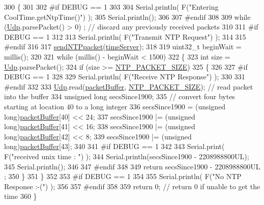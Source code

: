 \begin{DoxyCode}
300 \{
301 
302 \textcolor{preprocessor}{#if DEBUG == 1 }
303 
304     Serial.println( F(\textcolor{stringliteral}{"Entering CoolTime.getNtpTime()"}) );
305     Serial.println();
306 
307 \textcolor{preprocessor}{#endif }
308 
309     \textcolor{keywordflow}{while} (\hyperlink{classCoolTime_a4e23216a8121ca79d0fb019f30884b92}{Udp}.parsePacket() > 0) ; \textcolor{comment}{// discard any previously received packets}
310 
311 \textcolor{preprocessor}{#if DEBUG == 1 }
312     
313     Serial.println( F(\textcolor{stringliteral}{"Transmit NTP Request"}) );
314 
315 \textcolor{preprocessor}{#endif }
316 
317     \hyperlink{classCoolTime_a236a38d120dc53bc67456d763838c5a1}{sendNTPpacket}(\hyperlink{classCoolTime_ad2b9858f399108cb440dd1e908916f04}{timeServer});
318 
319     uint32\_t beginWait = millis();
320 
321     \textcolor{keywordflow}{while} (millis() - beginWait < 1500) 
322     \{
323         \textcolor{keywordtype}{int} size = \hyperlink{classCoolTime_a4e23216a8121ca79d0fb019f30884b92}{Udp}.parsePacket();
324         \textcolor{keywordflow}{if} (size >= \hyperlink{CoolTime_8h_a56a6ea64006651b4f42adf713e244f06}{NTP\_PACKET\_SIZE}) 
325         \{
326         
327 \textcolor{preprocessor}{        #if DEBUG == 1}
328 
329             Serial.println( F(\textcolor{stringliteral}{"Receive NTP Response"}) );
330         
331 \textcolor{preprocessor}{        #endif}
332 
333             \hyperlink{classCoolTime_a4e23216a8121ca79d0fb019f30884b92}{Udp}.read(\hyperlink{classCoolTime_a27e6abc82a5c2f72161956967005bec7}{packetBuffer}, \hyperlink{CoolTime_8h_a56a6ea64006651b4f42adf713e244f06}{NTP\_PACKET\_SIZE});  \textcolor{comment}{// read packet into the
       buffer}
334             \textcolor{keywordtype}{unsigned} \textcolor{keywordtype}{long} secsSince1900;
335             \textcolor{comment}{// convert four bytes starting at location 40 to a long integer}
336             secsSince1900 =  (\textcolor{keywordtype}{unsigned} long)\hyperlink{classCoolTime_a27e6abc82a5c2f72161956967005bec7}{packetBuffer}[40] << 24;
337             secsSince1900 |= (\textcolor{keywordtype}{unsigned} long)\hyperlink{classCoolTime_a27e6abc82a5c2f72161956967005bec7}{packetBuffer}[41] << 16;
338             secsSince1900 |= (\textcolor{keywordtype}{unsigned} long)\hyperlink{classCoolTime_a27e6abc82a5c2f72161956967005bec7}{packetBuffer}[42] << 8;
339             secsSince1900 |= (\textcolor{keywordtype}{unsigned} long)\hyperlink{classCoolTime_a27e6abc82a5c2f72161956967005bec7}{packetBuffer}[43];
340         
341 \textcolor{preprocessor}{        #if DEBUG == 1 }
342     
343             Serial.print( F(\textcolor{stringliteral}{"received unix time : "}) );
344             Serial.println(secsSince1900 - 2208988800UL);
345             Serial.println();
346 
347 \textcolor{preprocessor}{        #endif }
348 
349             \textcolor{keywordflow}{return} secsSince1900 - 2208988800UL ;
350         \}
351     \}
352     
353 \textcolor{preprocessor}{#if DEBUG == 1}
354 
355     Serial.println( F(\textcolor{stringliteral}{"No NTP Response :-("}) );
356 
357 \textcolor{preprocessor}{#endif }
358 
359     \textcolor{keywordflow}{return} 0; \textcolor{comment}{// return 0 if unable to get the time}
360 \}
\end{DoxyCode}
